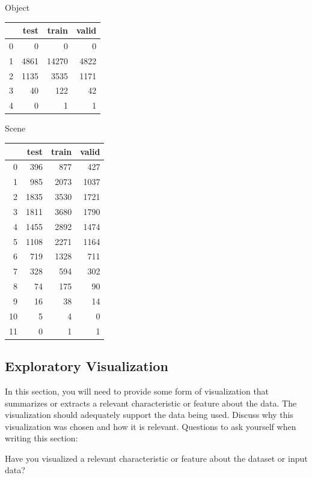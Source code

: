 \documentclass[12pt,journal,compsoc]{IEEEtran}
\begin{document}
Object
\begin{table}
\begin{tabular}{rrrr}
\toprule
{} &  test &  train &  valid \\
\midrule
0 &     0 &      0 &      0 \\
1 &  4861 &  14270 &   4822 \\
2 &  1135 &   3535 &   1171 \\
3 &    40 &    122 &     42 \\
4 &     0 &      1 &      1 \\
\bottomrule
\end{tabular}
\end{table}

Scene
\begin{table}
\begin{tabular}{rrrr}
\toprule
{} &  test &  train &  valid \\
\midrule
0  &   396 &    877 &    427 \\
1  &   985 &   2073 &   1037 \\
2  &  1835 &   3530 &   1721 \\
3  &  1811 &   3680 &   1790 \\
4  &  1455 &   2892 &   1474 \\
5  &  1108 &   2271 &   1164 \\
6  &   719 &   1328 &    711 \\
7  &   328 &    594 &    302 \\
8  &    74 &    175 &     90 \\
9  &    16 &     38 &     14 \\
10 &     5 &      4 &      0 \\
11 &     0 &      1 &      1 \\
\bottomrule
\end{tabular}
\end{table}


\subsection{Exploratory Visualization}
In this section, you will need to provide some form of visualization that summarizes or extracts a relevant characteristic or feature about the data. The visualization should adequately support the data being used. Discuss why this visualization was chosen and how it is relevant. Questions to ask yourself when writing this section:

Have you visualized a relevant characteristic or feature about the dataset or input data?
\end{document}
